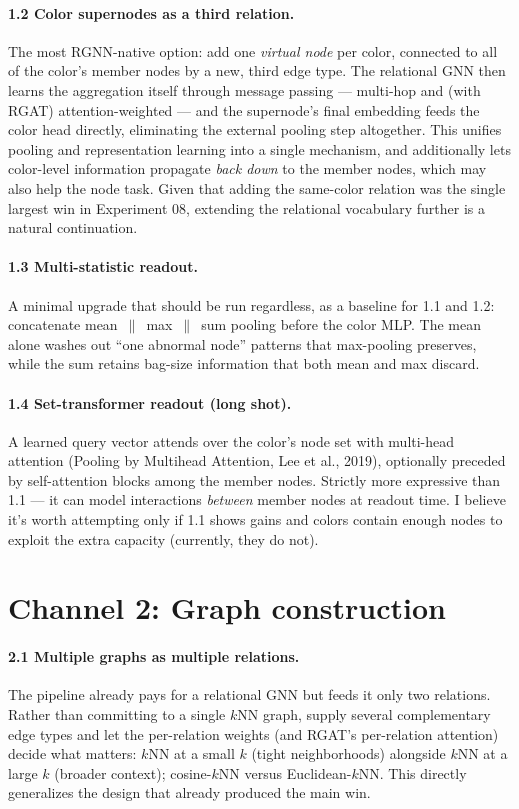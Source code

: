 \documentclass[11pt]{article}
\begin{document}
\paragraph{1.2 Color supernodes as a third relation.}
The most RGNN-native option: add one \emph{virtual node} per color, connected to all of the color's member nodes by a new, third edge type. The relational GNN then learns the aggregation itself through message passing --- multi-hop and (with RGAT) attention-weighted --- and the supernode's final embedding feeds the color head directly, eliminating the external pooling step altogether. This unifies pooling and representation learning into a single mechanism, and additionally lets color-level information propagate \emph{back down} to the member nodes, which may also help the node task. Given that adding the same-color relation was the single largest win in Experiment 08, extending the relational vocabulary further is a natural continuation.

\paragraph{1.3 Multi-statistic readout.}
A minimal upgrade that should be run regardless, as a baseline for 1.1 and 1.2: concatenate mean~$\|$~max~$\|$~sum pooling before the color MLP. The mean alone washes out ``one abnormal node'' patterns that max-pooling preserves, while the sum retains bag-size information that both mean and max discard.

\paragraph{1.4 Set-transformer readout (long shot).}
A learned query vector attends over the color's node set with multi-head attention (Pooling by Multihead Attention, Lee et al., 2019), optionally preceded by self-attention blocks among the member nodes. Strictly more expressive than 1.1 --- it can model interactions \emph{between} member nodes at readout time. I believe it's worth attempting only if 1.1 shows gains and colors contain enough nodes to exploit the extra capacity (currently, they do not).

\section*{Channel 2: Graph construction}

\paragraph{2.1 Multiple graphs as multiple relations.}
The pipeline already pays for a relational GNN but feeds it only two relations. Rather than committing to a single $k$NN graph, supply several complementary edge types and let the per-relation weights (and RGAT's per-relation attention) decide what matters: $k$NN at a small $k$ (tight neighborhoods) alongside $k$NN at a large $k$ (broader context); cosine-$k$NN versus Euclidean-$k$NN. This directly generalizes the design that already produced the main win.
\end{document}
